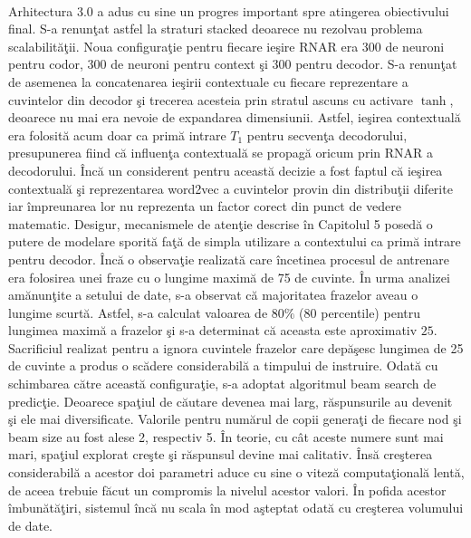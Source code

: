 \paragraph{}
Arhitectura 3.0 a adus cu sine un progres important spre atingerea obiectivului final. S-a renun\c tat astfel la straturi stacked deoarece nu rezolvau problema scalabilit\u a\c tii. Noua configura\c tie pentru fiecare ie\c sire RNAR era 300 de neuroni pentru codor, 300 de neuroni pentru context \c si 300 pentru decodor. S-a renun\c tat de asemenea la concatenarea ie\c sirii contextuale cu fiecare reprezentare a cuvintelor din decodor \c si trecerea acesteia prin stratul ascuns cu activare \(\tanh\), deoarece nu mai era nevoie de expandarea dimensiunii. Astfel, ie\c sirea contextual\u a era folosit\u a acum doar ca prim\u a intrare \(T_1\) pentru secven\c ta decodorului, presupunerea fiind c\u a influen\c ta contextual\u a se propag\u a oricum prin RNAR a decodorului. \^ Inc\u a un considerent pentru aceast\u a decizie a fost faptul c\u a ie\c sirea contextual\u a \c si reprezentarea word2vec a cuvintelor provin din distribu\c tii diferite iar \^ impreunarea lor nu reprezenta un factor corect din punct de vedere matematic. Desigur, mecanismele de aten\c tie descrise \^ in Capitolul 5 posed\u a o putere de modelare sporit\u a fa\c t\u a de simpla utilizare a contextului ca prim\u a intrare pentru decodor. \^ Inc\u a o observa\c tie realizat\u a care \^ incetinea procesul de antrenare era folosirea unei fraze cu o lungime maxim\u a de 75 de cuvinte. \^ In urma analizei am\u anun\c tite a setului de date, s-a observat c\u a majoritatea frazelor aveau o lungime scurt\u a. Astfel, s-a calculat valoarea de \(80\%\) (80 percentile) \cite{johnson2007elementary} pentru lungimea maxim\u a a frazelor \c si s-a determinat c\u a aceasta este aproximativ \(25\). Sacrificiul realizat pentru a ignora cuvintele frazelor care dep\u a\c sesc lungimea de 25 de cuvinte a produs o sc\u adere considerabil\u a a timpului de instruire. Odat\u a cu schimbarea c\u atre aceast\u a configura\c tie, s-a adoptat algoritmul beam search de predic\c tie. Deoarece spa\c tiul de c\u autare devenea mai larg, r\u aspunsurile au devenit \c si ele mai diversificate. Valorile pentru num\u arul de copii genera\c ti de fiecare nod \c si beam size au fost alese 2, respectiv 5. \^ In teorie, cu c\^ at aceste numere sunt mai mari, spa\c tiul explorat cre\c ste \c si r\u aspunsul devine mai calitativ. \^ Ins\u a cre\c sterea considerabil\u a a acestor doi parametri aduce cu sine o vitez\u a computa\c tional\u a lent\u a, de aceea trebuie f\u acut un compromis la nivelul acestor valori. \^ In pofida acestor \^ imbun\u at\u a\c tiri, sistemul \^ inc\u a nu scala \^ in mod a\c steptat odat\u a cu cre\c sterea volumului de date.

